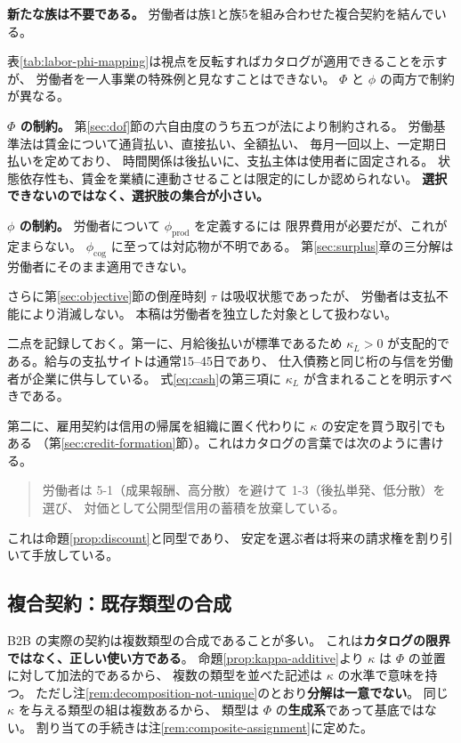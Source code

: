 \textbf{新たな族は不要である。} 労働者は族1と族5を組み合わせた複合契約を結んでいる。

\begin{remark}
\label{rem:worker-constraints}
表\ref{tab:labor-phi-mapping}は視点を反転すればカタログが適用できることを示すが、
労働者を一人事業の特殊例と見なすことはできない。
$\Phi$ と $\phi$ の両方で制約が異なる。

\textbf{$\Phi$ の制約。} 第\ref{sec:dof}節の六自由度のうち五つが法により制約される。
労働基準法は賃金について通貨払い、直接払い、全額払い、
毎月一回以上、一定期日払いを定めており、
時間関係は後払いに、支払主体は使用者に固定される。
状態依存性も、賃金を業績に連動させることは限定的にしか認められない。
\textbf{選択できないのではなく、選択肢の集合が小さい。}

\textbf{$\phi$ の制約。} 労働者について $\phi_{\mathrm{prod}}$ を定義するには
限界費用が必要だが、これが定まらない。
$\phi_{\mathrm{cog}}$ に至っては対応物が不明である。
第\ref{sec:surplus}章の三分解は労働者にそのまま適用できない。

さらに第\ref{sec:objective}節の倒産時刻 $\tau$ は吸収状態であったが、
労働者は支払不能により消滅しない。
本稿は労働者を独立した対象として扱わない。
\end{remark}

二点を記録しておく。第一に、月給後払いが標準であるため
$\kappa_L>0$ が支配的である。給与の支払サイトは通常15--45日であり、
仕入債務と同じ桁の与信を労働者が企業に供与している。
式\eqref{eq:cash}の第三項に $\kappa_L$ が含まれることを明示すべきである。

第二に、雇用契約は信用の帰属を組織に置く代わりに $\kappa$ の安定を買う取引でもある
（第\ref{sec:credit-formation}節）。これはカタログの言葉では次のように書ける。
\begin{quote}
労働者は 5-1（成果報酬、高分散）を避けて 1-3（後払単発、低分散）を選び、
対価として公開型信用の蓄積を放棄している。
\end{quote}
これは命題\ref{prop:discount}と同型であり、
安定を選ぶ者は将来の請求権を割り引いて手放している。

\subsection{複合契約：既存類型の合成}
\label{sec:composite}

B2B の実際の契約は複数類型の合成であることが多い。
これは\textbf{カタログの限界ではなく、正しい使い方である}。
命題\ref{prop:kappa-additive}より $\kappa$ は $\Phi$ の並置に対して加法的であるから、
複数の類型を並べた記述は $\kappa$ の水準で意味を持つ。
ただし注\ref{rem:decomposition-not-unique}のとおり\textbf{分解は一意でない}。
同じ $\kappa$ を与える類型の組は複数あるから、
類型は $\Phi$ の\textbf{生成系}であって基底ではない。
割り当ての手続きは注\ref{rem:composite-assignment}に定めた。

